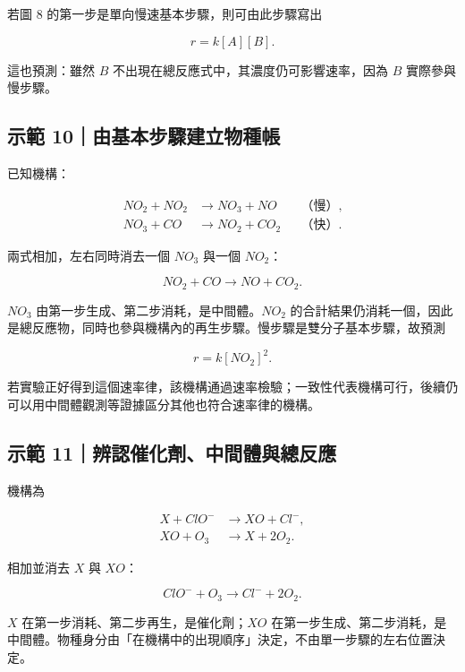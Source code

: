 \documentclass[11pt,a4paper]{article}
\begin{document}
若圖 8 的第一步是單向慢速基本步驟，則可由此步驟寫出

\[
r=k[A][B].
\]

這也預測：雖然 \(B\) 不出現在總反應式中，其濃度仍可影響速率，因為 \(B\) 實際參與慢步驟。

\begin{HandoutWorkedExample}

\subsection{示範 10｜由基本步驟建立物種帳}\label{ux793aux7bc4-10ux7531ux57faux672cux6b65ux9a5fux5efaux7acbux7269ux7a2eux5e33}

已知機構：

\[
\begin{aligned}
NO_2+NO_2&\longrightarrow NO_3+NO &&\text{（慢）},\\
NO_3+CO&\longrightarrow NO_2+CO_2 &&\text{（快）}.
\end{aligned}
\]

兩式相加，左右同時消去一個 \(NO_3\) 與一個 \(NO_2\)：

\[
NO_2+CO\longrightarrow NO+CO_2.
\]

\(NO_3\) 由第一步生成、第二步消耗，是中間體。\(NO_2\) 的合計結果仍消耗一個，因此是總反應物，同時也參與機構內的再生步驟。慢步驟是雙分子基本步驟，故預測

\[
r=k[NO_2]^2.
\]

若實驗正好得到這個速率律，該機構通過速率檢驗；一致性代表機構可行，後續仍可以用中間體觀測等證據區分其他也符合速率律的機構。

\end{HandoutWorkedExample}

\begin{HandoutWorkedExample}

\subsection{示範 11｜辨認催化劑、中間體與總反應}\label{ux793aux7bc4-11ux8fa8ux8a8dux50acux5316ux5291ux4e2dux9593ux9ad4ux8207ux7e3dux53cdux61c9}

機構為

\[
\begin{aligned}
X+ClO^-&\longrightarrow XO+Cl^-,\\
XO+O_3&\longrightarrow X+2O_2.
\end{aligned}
\]

相加並消去 \(X\) 與 \(XO\)：

\[
ClO^-+O_3\longrightarrow Cl^-+2O_2.
\]

\(X\) 在第一步消耗、第二步再生，是催化劑；\(XO\) 在第一步生成、第二步消耗，是中間體。物種身分由「在機構中的出現順序」決定，不由單一步驟的左右位置決定。

\end{HandoutWorkedExample}
\end{document}
